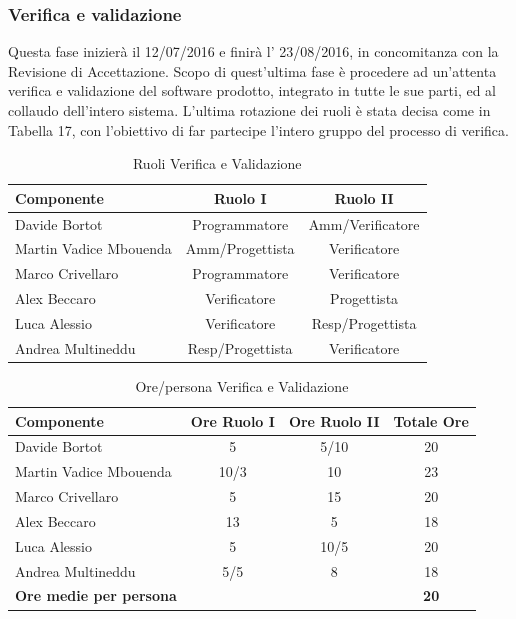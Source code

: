 \documentclass[a4paper,11pt]{article}
\begin{document}
		\subsubsection{Verifica e validazione}
		Questa fase inizierà il 12/07/2016 e finirà l' 23/08/2016, in concomitanza con la Revisione di Accettazione. Scopo di quest'ultima fase è procedere ad un'attenta verifica e validazione del software prodotto, integrato in tutte le sue parti, ed al collaudo dell'intero sistema. L'ultima rotazione dei ruoli è stata decisa come in Tabella 17, con l'obiettivo di far partecipe l'intero gruppo del processo di verifica.
		\begin{table}[h!]			
		\begin{center}
			\begin{tabular}{l c c}
			\textbf{Componente} & \textbf{Ruolo I} & \textbf{Ruolo II} \\
			\midrule
			Davide Bortot & Programmatore & Amm/Verificatore\\
			Martin Vadice Mbouenda & Amm/Progettista & Verificatore\\
			Marco Crivellaro & Programmatore & Verificatore\\
			Alex Beccaro & Verificatore & Progettista\\
			Luca Alessio & Verificatore & Resp/Progettista\\
			Andrea Multineddu & Resp/Progettista & Verificatore\\
			\midrule
			\end{tabular}
		\end{center}
		\caption{Ruoli Verifica e Validazione}
		\end{table}
		\begin{table}[h]			
		\begin{center}
			\begin{tabular}{l c c c}
			\textbf{Componente} & \textbf{Ore Ruolo I} & \textbf{Ore Ruolo II} & \textbf{Totale Ore}\\
			\midrule
			Davide Bortot & 5 & 5/10 & 20\\
			Martin Vadice Mbouenda & 10/3 & 10 & 23\\
			Marco Crivellaro & 5 & 15 & 20 \\
			Alex Beccaro & 13 & 5 & 18\\
			Luca Alessio & 5 & 10/5 & 20\\
			Andrea Multineddu & 5/5 & 8 & 18\\
			\midrule
			\textbf{Ore medie per persona} & & & \textbf{20}\\
			\end{tabular}
		\end{center}
		\caption{Ore/persona Verifica e Validazione}
		\end{table}
		
\end{document}
